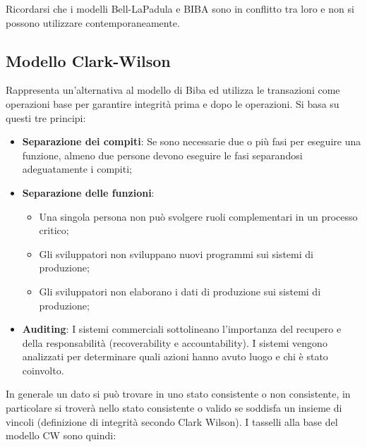 Ricordarsi che i modelli Bell-LaPadula e BIBA sono in conflitto tra loro e
non si possono utilizzare
contemporaneamente.

\subsection{Modello Clark-Wilson}

Rappresenta un'alternativa al modello di Biba ed utilizza le transazioni come
operazioni base per
garantire integrità prima e dopo le operazioni.
Si basa su questi tre principi:

\begin{itemize}
      \item \textbf{Separazione dei compiti}: Se sono necessarie due o più fasi per
            eseguire una funzione,
            almeno due persone devono eseguire le fasi separandosi adeguatamente
            i compiti;
      \item \textbf{Separazione delle funzioni}:
            \begin{itemize}
                  \item Una singola persona non può svolgere ruoli complementari
                        in un processo critico;
                  \item Gli sviluppatori non sviluppano nuovi programmi sui
                        sistemi di produzione;
                  \item Gli sviluppatori non elaborano i dati di produzione sui
                        sistemi di produzione;
            \end{itemize}
      \item \textbf{Auditing}: I sistemi commerciali sottolineano l'importanza del
            recupero e della responsabilità
            (recoverability e accountability). I sistemi vengono analizzati per
            determinare quali azioni
            hanno avuto luogo e chi è stato coinvolto.
\end{itemize}

In generale un dato si può trovare in uno stato consistente o non consistente,
in particolare si
troverà nello stato consistente o valido se soddisfa un insieme di vincoli
(definizione di integrità
secondo Clark Wilson).
I tasselli alla base del modello CW sono quindi:

